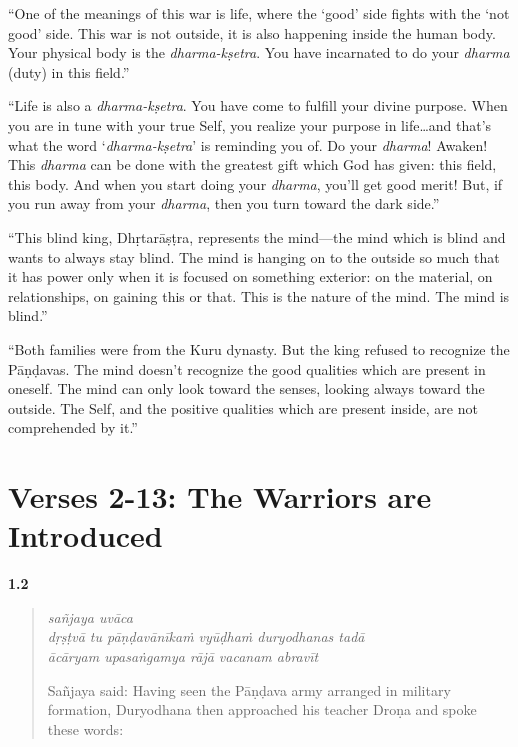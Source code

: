 \enquote{One of the meanings of this war is life, where the \enquote{good} side fights with the \enquote{not good} side. This war is not outside, it is also happening inside the human body. Your physical body is the \textit{dharma-kṣetra}. You have incarnated to do your \textit{dharma} (duty) in this field.}

\enquote{Life is also a \textit{dharma-kṣetra}. You have come to fulfill your divine purpose. When you are in tune with your true Self, you realize your purpose in life\ldots and that’s what the word \enquote{\textit{dharma-kṣetra}} is reminding you of. Do your \textit{dharma}! Awaken! This \textit{dharma} can be done with the greatest gift which God has given: this field, this body. And when you start doing your \textit{dharma}, you’ll get good merit! But, if you run away from your \textit{dharma}, then you turn toward the dark side.}

\enquote{This blind king, Dhṛtarāṣṭra, represents the mind---the mind which is blind and wants to always stay blind. The mind is hanging on to the outside so much that it has power only when it is focused on something exterior: on the material, on relationships, on gaining this or that. This is the nature of the mind. The mind is blind.}

\enquote{Both families were from the Kuru dynasty. But the king refused to recognize the Pāṇḍavas. The mind doesn’t recognize the good qualities which are present in oneself. The mind can only look toward the senses, looking always toward the outside. The Self, and the positive qualities which are present inside, are not comprehended by it.}

\section{Verses 2-13: The Warriors are Introduced}\label{sec-verses-2-13-the-warriors-are-introduced}



\par\noindent\textbf{1.2}\par
\begin{verse}
\textit{sañjaya uvāca} \\
\textit{dṛṣṭvā tu pāṇḍavānīkaṁ vyūḍhaṁ duryodhanas tadā} \\
\textit{ācāryam upasaṅgamya rājā vacanam abravīt}

\noindent Sañjaya said: Having seen the Pāṇḍava army arranged in military formation, Duryodhana then approached his teacher Droṇa and spoke these words:
\end{verse}
\par




